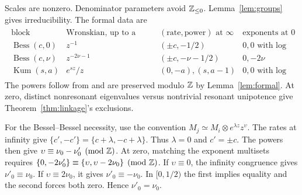 Scales are nonzero. Denominator parameters avoid $\mathbb{Z}_{\le0}$. Lemma~\ref{lem:groups} gives irreducibility. The formal data are
\begin{equation*}
\begin{gathered}
\begin{array}{c|c|c|c}
 \text{block}&\text{Wronskian, up to a constant}&
   (\text{rate},\text{power})\text{ at }\infty&\text{exponents at }0\\ \hline
 \operatorname{Bess}(c,0)&z^{-1}&(\pm c,-1/2)&0,0\text{ with log}\\
 \operatorname{Bess}(c,\nu)&z^{-2\nu-1}&(\pm c,-\nu-1/2)&0,-2\nu\\
 \operatorname{Kum}(s,a)&e^{sz}/z&(0,-a),(s,a-1)&0,0\text{ with log}
\end{array}
\end{gathered}
\end{equation*}
The powers follow from \cite[10.40.1, 13.7.2--13.7.3]{DLMF} and are
preserved modulo $\mathbb{Z}$ by Lemma~\ref{lem:formal}. At zero, distinct
nonresonant eigenvalues versus nontrivial resonant unipotence give
Theorem~\ref{thm:linkage}'s exclusions.

For the Bessel--Bessel necessity, use the convention
$M_j\simeq M_i\otimes e^{\lambda z}z^\upsilon$.
The rates at infinity give
$\{c',-c'\}=\{c+\lambda,-c+\lambda\}$. Thus $\lambda=0$ and
$c'=\pm c$. The powers then give $\upsilon\equiv\nu_0-\nu'_0\pmod{\mathbb{Z}}$.
At zero, matching the exponent multisets requires
$\{0,-2\nu'_0\}\equiv\{\upsilon,\upsilon-2\nu_0\}\pmod{\mathbb{Z}}$.
If $\upsilon\equiv0$, the infinity congruence gives $\nu'_0\equiv\nu_0$. If $\upsilon\equiv2\nu_0$, it gives $\nu'_0\equiv-\nu_0$.
In $[0,1/2)$ the first implies equality and the second forces both zero. Hence $\nu'_0=\nu_0$.
